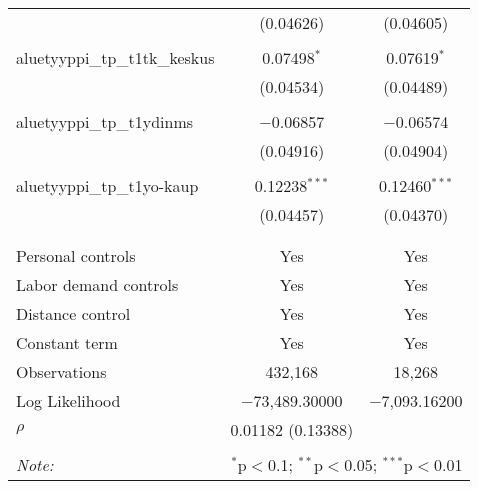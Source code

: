 \begin{table}[!htbp]
\begin{tabular}{@{\extracolsep{5pt}}lcc}
  & (0.04626) & (0.04605) \\ 
  & & \\ 
 aluetyyppi\_tp\_t1tk\_keskus & 0.07498$^{*}$ & 0.07619$^{*}$ \\ 
  & (0.04534) & (0.04489) \\ 
  & & \\ 
 aluetyyppi\_tp\_t1ydinms & $-$0.06857 & $-$0.06574 \\ 
  & (0.04916) & (0.04904) \\ 
  & & \\ 
 aluetyyppi\_tp\_t1yo-kaup & 0.12238$^{***}$ & 0.12460$^{***}$ \\ 
  & (0.04457) & (0.04370) \\ 
  & & \\ 
\hline \\[-1.8ex] 
Personal controls & Yes & Yes \\ 
Labor demand controls & Yes & Yes \\ 
Distance control & Yes & Yes \\ 
Constant term & Yes & Yes \\ 
Observations & 432,168 & 18,268 \\ 
Log Likelihood & $-$73,489.30000 & $-$7,093.16200 \\ 
$\rho$ & 0.01182  (0.13388) &  \\ 
\hline 
\hline \\[-1.8ex] 
\textit{Note:}  & \multicolumn{2}{r}{$^{*}$p$<$0.1; $^{**}$p$<$0.05; $^{***}$p$<$0.01} \\ 
\end{tabular} 
\end{table} 
